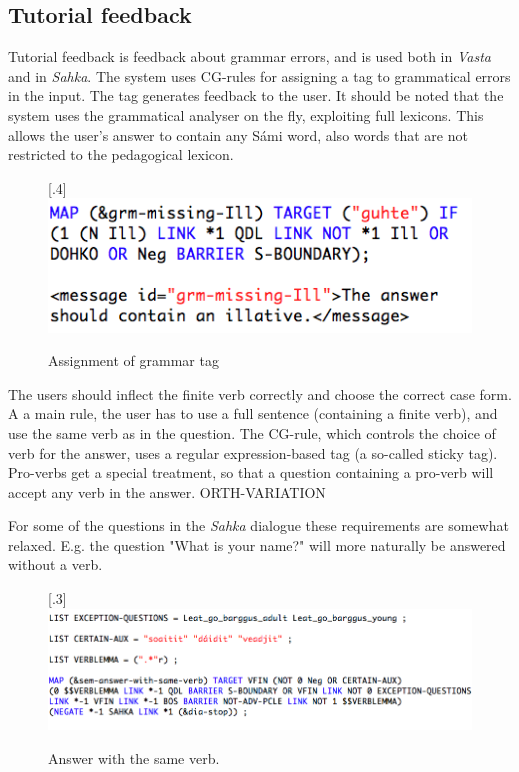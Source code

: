 \documentclass[11pt]{article}
\begin{document}
\subsection{Tutorial feedback}
Tutorial feedback is feedback about grammar errors, and is used both in \textit{Vasta} and in \textit{Sahka}. The system uses CG-rules for assigning a tag to grammatical errors in the input. The tag generates feedback to the user. It should be noted that the system uses the grammatical analyser on the fly, exploiting full lexicons. This allows the user's answer to contain any Sámi word, also words that are not restricted to the pedagogical lexicon.

\begin{figure}%
\begin{center}
\scalebox{.4}[.4]{\includegraphics{presentation/img/missingIll.png}}\\
\caption{Assignment of grammar tag}
\end{center}
\end{figure}


The users should inflect the finite verb correctly and choose the correct case form. A a main rule, the user has to use a full sentence (containing a finite verb), and use the same verb as in the question. The CG-rule, which controls the choice of verb for the answer, uses a regular expression-based tag (a so-called sticky tag). Pro-verbs get a special treatment, so that a question containing a pro-verb will accept any verb in the answer. ORTH-VARIATION

For some of the questions in the \textit{Sahka} dialogue these requirements are somewhat relaxed. E.g. the question "What is your name?" will more naturally be answered without a verb. 

\begin{figure}%
\begin{center}
\scalebox{.3}[.3]{\includegraphics{presentation/img/verblemma.png}}\\
\caption{Answer with the same verb.}
\end{center}
\end{figure}
\end{document}
